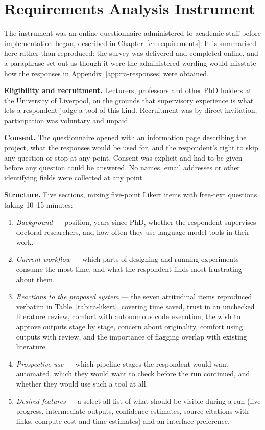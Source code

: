 \chapter{Requirements Analysis Instrument}
\label{app:ra-instrument}

The instrument was an online questionnaire administered to academic staff before
implementation began, described in Chapter~\ref{ch:requirements}. It is
summarised here rather than reproduced: the survey was delivered and completed
online, and a paraphrase set out as though it were the administered wording
would misstate how the responses in Appendix~\ref{app:ra-responses} were
obtained.

\textbf{Eligibility and recruitment.} Lecturers, professors and other PhD
holders at the University of Liverpool, on the grounds that supervisory
experience is what lets a respondent judge a tool of this kind. Recruitment was
by direct invitation; participation was voluntary and unpaid.

\textbf{Consent.} The questionnaire opened with an information page describing
the project, what the responses would be used for, and the respondent's right to
skip any question or stop at any point. Consent was explicit and had to be given
before any question could be answered. No names, email addresses or other
identifying fields were collected at any point.

\textbf{Structure.} Five sections, mixing five-point Likert items with free-text
questions, taking 10--15 minutes:

\begin{enumerate}[nosep]
  \item \emph{Background} --- position, years since PhD, whether the respondent
        supervises doctoral researchers, and how often they use language-model
        tools in their work.
  \item \emph{Current workflow} --- which parts of designing and running
        experiments consume the most time, and what the respondent finds most
        frustrating about them.
  \item \emph{Reactions to the proposed system} --- the seven attitudinal items
        reproduced verbatim in Table~\ref{tab:ra-likert}, covering time saved,
        trust in an unchecked literature review, comfort with autonomous code
        execution, the wish to approve outputs stage by stage, concern about
        originality, comfort using outputs with review, and the importance of
        flagging overlap with existing literature.
  \item \emph{Prospective use} --- which pipeline stages the respondent would
        want automated, which they would want to check before the run continued,
        and whether they would use such a tool at all.
  \item \emph{Desired features} --- a select-all list of what should be visible
        during a run (live progress, intermediate outputs, confidence estimates,
        source citations with links, compute cost and time estimates) and an
        interface preference.
\end{enumerate}

